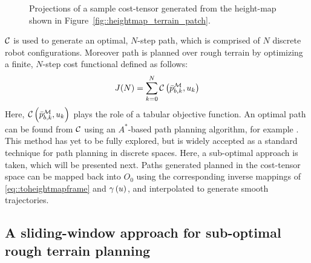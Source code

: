 				\begin{figure}[!h]
					\centering
					\caption{Projections of a sample cost-tensor generated from the height-map shown in Figure~\ref{fig::heightmap_terrain_patch}.}
					\label{fig::cost_map}
				\end{figure}

			${\cal C}$ is used to generate an optimal, $N$-step path, which is comprised of $N$ discrete robot configurations. Moreover path is planned over rough terrain by optimizing a finite, $N$-step cost functional defined as follows:
				\begin{equation}			
					J(N) = \sum_{k=0}^N {\cal C}\left(\bar{p}^{{\cal M}}_{b,k},u_{k}\right)
				\end{equation}
			Here, ${\cal C}\left(\bar{p}^{{\cal M}}_{b,k},u_{k}\right)$ plays the role of a tabular objective function. An optimal path can be found from ${\cal C}$ using an $A^{*}$-based path planning algorithm, for example \cite{Hart1968}. This method has yet to be fully explored, but is widely accepted as a standard technique for path planning in discrete spaces. Here, a sub-optimal approach is taken, which will be presented next.  Paths generated planned in the cost-tensor space can be mapped back into $O_{0}$ using the corresponding inverse mappings of \ref{eq::toheightmapframe} and $\gamma\left(u\right)$, and interpolated to generate smooth trajectories.
			


		\subsection{A sliding-window approach for sub-optimal rough terrain planning}

